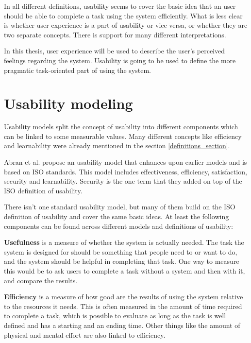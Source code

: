 In all different definitions, usability seems to cover the basic idea that an user should be able to complete a task using the system efficiently. What is less clear is whether user experience is a part of usability or vice versa, or whether they are two separate concepts. There is support for many different interpretations.

In this thesis, user experience will be used to describe the user's perceived feelings regarding the system. Usability is going to be used to define the more pragmatic task-oriented part of using the system.


\section{Usability modeling}\label{usability_attributes}
Usability models split the concept of usability into different components which can be linked to some measurable values. Many different concepts like efficiency and learnability were already mentioned in the section \ref{definitions_section}.

Abran et al. propose an usability model that enhances upon earlier models and is based on ISO standards. This model includes effectiveness, efficiency, satisfaction, security and learnability. \cite{abran2003usability} Security is the one term that they added on top of the ISO definition of usability.

There isn't one standard usability model, but many of them build on the ISO definition of usability and cover the same basic ideas. At least the following components can be found across different models and definitions of usability:

\textbf{Usefulness} is a measure of whether the system is actually needed. The task the system is designed for should be something that people need to or want to do, and the system should be helpful in completing that task. One way to measure this would be to ask users to complete a task without a system and then with it, and compare the results.

\textbf{Efficiency} is a measure of how good are the results of using the system relative to the resources it needs. This is often measured in the amount of time required to complete a task, which is possible to evaluate as long as the task is well defined and has a starting and an ending time. Other things like the amount of physical and mental effort are also linked to efficiency.

